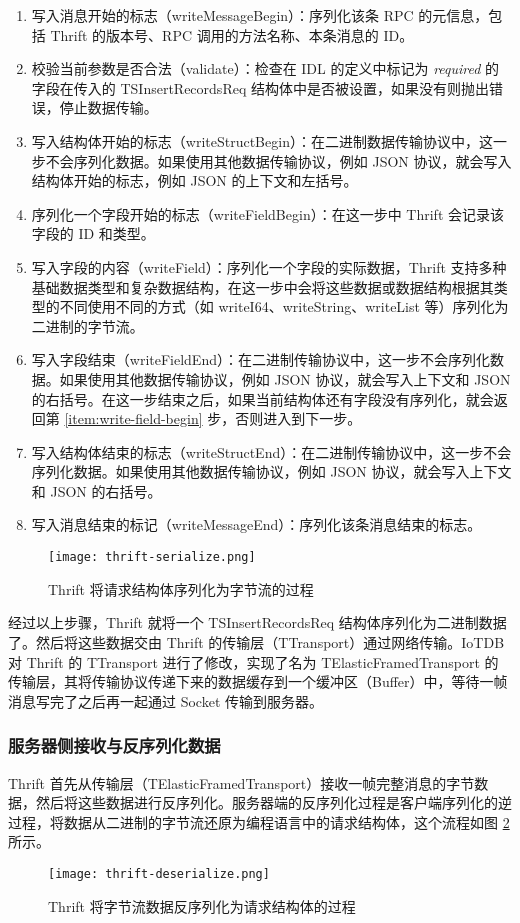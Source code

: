 \begin{enumerate}
  \item 写入消息开始的标志（writeMessageBegin）：序列化该条 RPC 的元信息，包括 Thrift 的版本号、RPC 调用的方法名称、本条消息的 ID。
  \item 校验当前参数是否合法（validate）：检查在 IDL 的定义中标记为 \emph{required} 的字段在传入的 TSInsertRecordsReq 结构体中是否被设置，如果没有则抛出错误，停止数据传输。
  \item 写入结构体开始的标志（writeStructBegin）：在二进制数据传输协议中，这一步不会序列化数据。如果使用其他数据传输协议，例如 JSON 协议，就会写入结构体开始的标志，例如 JSON 的上下文和左括号。
  \item\label{item:write-field-begin}  序列化一个字段开始的标志（writeFieldBegin）：在这一步中 Thrift 会记录该字段的 ID 和类型。
  \item 写入字段的内容（writeField）：序列化一个字段的实际数据，Thrift 支持多种基础数据类型和复杂数据结构，在这一步中会将这些数据或数据结构根据其类型的不同使用不同的方式（如 writeI64、writeString、writeList 等）序列化为二进制的字节流。
  \item 写入字段结束（writeFieldEnd）：在二进制传输协议中，这一步不会序列化数据。如果使用其他数据传输协议，例如 JSON 协议，就会写入上下文和 JSON 的右括号。在这一步结束之后，如果当前结构体还有字段没有序列化，就会返回第 \ref{item:write-field-begin} 步，否则进入到下一步。
  \item 写入结构体结束的标志（writeStructEnd）：在二进制传输协议中，这一步不会序列化数据。如果使用其他数据传输协议，例如 JSON 协议，就会写入上下文和 JSON 的右括号。
  \item 写入消息结束的标记（writeMessageEnd）：序列化该条消息结束的标志。
\end{enumerate}
\begin{figure}
  \centering
  \texttt{[image: thrift-serialize.png]}
  \caption{Thrift 将请求结构体序列化为字节流的过程}
  \label{fig:thrift-serialize}
\end{figure}
经过以上步骤，Thrift 就将一个 TSInsertRecordsReq 结构体序列化为二进制数据了。然后将这些数据交由 Thrift 的传输层（TTransport）通过网络传输。IoTDB 对 Thrift 的 TTransport 进行了修改，实现了名为 TElasticFramedTransport 的传输层，其将传输协议传递下来的数据缓存到一个缓冲区（Buffer）中，等待一帧消息写完了之后再一起通过 Socket 传输到服务器。
\subsubsection{服务器侧接收与反序列化数据}
Thrift 首先从传输层（TElasticFramedTransport）接收一帧完整消息的字节数据，然后将这些数据进行反序列化。服务器端的反序列化过程是客户端序列化的逆过程，将数据从二进制的字节流还原为编程语言中的请求结构体，这个流程如图 \ref{fig:thrift-deserialize} 所示。
\begin{figure}
  \centering
  \texttt{[image: thrift-deserialize.png]}
  \caption{Thrift 将字节流数据反序列化为请求结构体的过程}
  \label{fig:thrift-deserialize}
\end{figure}

